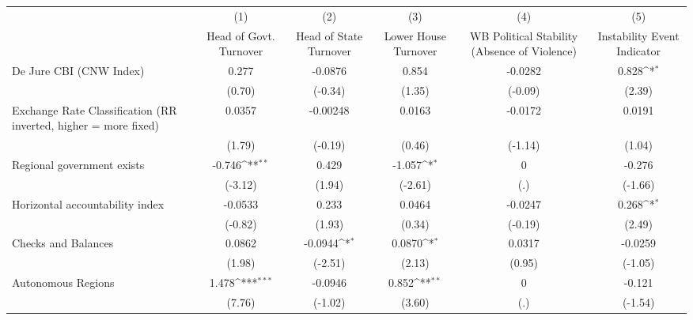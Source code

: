 {
\def\sym#1{\ifmmode^{#1}\else\(^{#1}\)\fi}
\begin{tabular*}{\linewidth}{@{\hskip\tabcolsep\extracolsep\fill}l*{5}{c}}
\hline\hline
                &\multicolumn{1}{c}{(1)}&\multicolumn{1}{c}{(2)}&\multicolumn{1}{c}{(3)}&\multicolumn{1}{c}{(4)}&\multicolumn{1}{c}{(5)}\\
                &\multicolumn{1}{c}{Head of Govt. Turnover}&\multicolumn{1}{c}{Head of State Turnover}&\multicolumn{1}{c}{Lower House Turnover}&\multicolumn{1}{c}{WB Political Stability (Absence of Violence)}&\multicolumn{1}{c}{Instability Event Indicator}\\
\hline
De Jure CBI (CNW Index)&    0.277         &  -0.0876         &    0.854         &  -0.0282         &    0.828\sym{*}  \\
                &   (0.70)         &  (-0.34)         &   (1.35)         &  (-0.09)         &   (2.39)         \\
[1em]
Exchange Rate Classification (RR inverted, higher = more fixed)&   0.0357         & -0.00248         &   0.0163         &  -0.0172         &   0.0191         \\
                &   (1.79)         &  (-0.19)         &   (0.46)         &  (-1.14)         &   (1.04)         \\
[1em]
Regional government exists   &   -0.746\sym{**} &    0.429         &   -1.057\sym{*}  &        0         &   -0.276         \\
                &  (-3.12)         &   (1.94)         &  (-2.61)         &      (.)         &  (-1.66)         \\
[1em]
Horizontal accountability index&  -0.0533         &    0.233         &   0.0464         &  -0.0247         &    0.268\sym{*}  \\
                &  (-0.82)         &   (1.93)         &   (0.34)         &  (-0.19)         &   (2.49)         \\
[1em]
Checks and Balances&   0.0862         &  -0.0944\sym{*}  &   0.0870\sym{*}  &   0.0317         &  -0.0259         \\
                &   (1.98)         &  (-2.51)         &   (2.13)         &   (0.95)         &  (-1.05)         \\
[1em]
Autonomous Regions&    1.478\sym{***}&  -0.0946         &    0.852\sym{**} &        0         &   -0.121         \\
                &   (7.76)         &  (-1.02)         &   (3.60)         &      (.)         &  (-1.54)         \\

\end{tabular*}}
